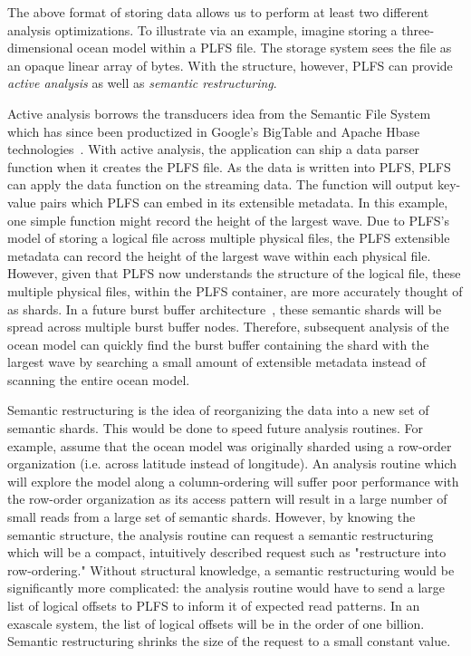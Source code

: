 The above format of storing data allows us to perform at least two different analysis optimizations.  To illustrate via an example, imagine storing a three-dimensional ocean model within a PLFS file. The storage system sees the file as an opaque linear array of bytes.  With the structure, however, PLFS can provide \textit{active analysis} as well as \textit{semantic restructuring}.  

Active analysis borrows the transducers idea from the Semantic File System~\cite{semantic_fs} which has since been productized in Google's BigTable and Apache Hbase technologies~\cite{google_coprocessors,GFS,apache_hbase}.  With active analysis, the application can ship a data parser function when it creates the PLFS file.  As the data is written into PLFS, PLFS can apply the data function on the streaming data.  The function will output key-value pairs which PLFS can embed in its extensible metadata.  In this example, one simple function might record the height of the largest wave.  Due to PLFS's model of storing a logical file across multiple physical files, the PLFS extensible metadata can record the height of the largest wave within each physical file.  However, given that PLFS now understands the structure of the logical file, these multiple physical files, within the PLFS container, are more accurately thought of as shards.  In a future burst buffer architecture~\cite{burst_buffers}, these semantic shards will be spread across multiple burst buffer nodes.  Therefore, subsequent analysis of the ocean model can quickly find the burst buffer containing the shard with the largest wave by searching a small amount of extensible metadata instead of scanning the entire ocean model.

Semantic restructuring is the idea of reorganizing the data into a new set of semantic shards.  This would be done to speed future analysis routines.  For example, assume that the ocean model was originally sharded using a row-order organization (i.e. across latitude instead of longitude).  An analysis routine which will explore the model along a column-ordering will suffer poor performance with the row-order organization as its access pattern will result in a large number of small reads from a large set of semantic shards.  However, by knowing the semantic structure, the analysis routine can request a semantic restructuring which will be a compact, intuitively described request such as "restructure into row-ordering."  Without structural knowledge, a semantic restructuring would be significantly more complicated: the analysis routine would have to send a large list of logical offsets to PLFS to inform it of expected read patterns.  In an exascale system, the list of logical offsets will be in the order of one billion.  Semantic restructuring shrinks the size of the request to a small constant value.


